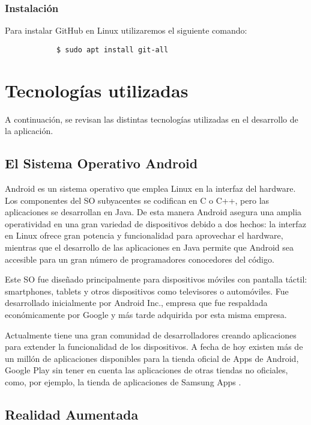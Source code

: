    \subsubsection{Instalación}

        Para instalar GitHub en Linux utilizaremos el siguiente comando:
        \begin{lstlisting}
            $ sudo apt install git-all
        \end{lstlisting}

\section{Tecnologías utilizadas}

A continuación, se revisan las distintas tecnologías utilizadas en el desarrollo de la aplicación.

\subsection{El Sistema Operativo Android}

Android es un sistema operativo que emplea Linux en la interfaz del hardware.  Los componentes del SO subyacentes se codifican en C o C++, pero las aplicaciones se desarrollan en Java. De esta manera Android asegura una amplia operatividad en una gran variedad de dispositivos debido a dos hechos: la interfaz en Linux ofrece gran potencia y funcionalidad para aprovechar el hardware, mientras que el desarrollo de las aplicaciones en Java permite que Android sea accesible para un gran número de programadores conocedores del código.

Este SO fue diseñado principalmente para dispositivos móviles con pantalla táctil: smartphones, tablets y otros dispositivos como televisores o automóviles. Fue desarrollado inicialmente por Android Inc., empresa que fue respaldada económicamente por Google y más tarde adquirida por esta misma empresa.

Actualmente tiene una gran comunidad de desarrolladores creando aplicaciones para extender la funcionalidad de los dispositivos. A fecha de hoy existen más de un millón de aplicaciones disponibles para la tienda oficial de Apps de Android, Google Play \cite{URL::GooglePlay} sin tener en cuenta las aplicaciones de otras tiendas no oficiales, como, por ejemplo, la tienda de aplicaciones de Samsung Apps \cite{URL::SamsungApps}. 

\subsection{Realidad Aumentada}

